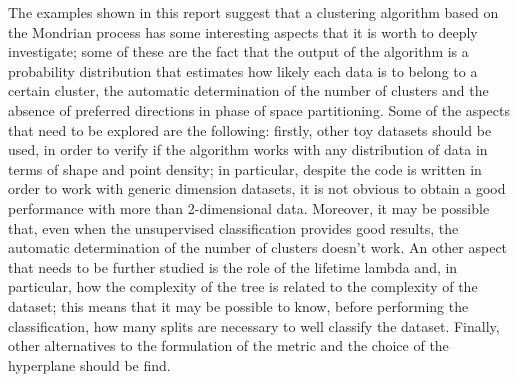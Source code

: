 \documentclass[a4paper]{article}
\begin{document}
The examples shown in this report suggest that a clustering algorithm based on the Mondrian process has some interesting aspects that it is worth to deeply investigate;
some of these are the fact that the output of the algorithm is a probability distribution that estimates how likely each data is to belong to a certain cluster, the automatic determination of the number of clusters and the absence of preferred directions in phase of space partitioning.
Some of the aspects that need to be explored are the following:
firstly, other toy datasets should be used, in order to verify if the algorithm works with any distribution of data in terms of shape and point density;
in particular, despite the code is written in order to work with generic dimension datasets, it is not obvious to obtain a good performance with more than 2-dimensional data.
Moreover, it may be possible that, even when the unsupervised classification provides good results, the automatic determination of the number of clusters doesn't work.
An other aspect that needs to be further studied is the role of the lifetime lambda and, in particular, how the complexity of the tree is related to the complexity of the dataset;
this means that it may be possible to know, before performing the classification, how many splits are necessary to well classify the dataset.
Finally, other alternatives to the formulation of the metric and the choice of the hyperplane should be find.
\end{document}
